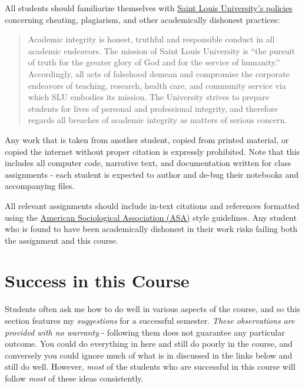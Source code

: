 \documentclass[
]{book}
\begin{document}
All students should familiarize themselves with \href{http://www.slu.edu/Documents/provost/academic_affairs/Academic\%20Integrity\%20Policy\%20FINAL\%20\%206-26-15.pd}{Saint Louis University's policies} concerning cheating, plagiarism, and other academically dishonest practices:

\begin{quote}
Academic integrity is honest, truthful and responsible conduct in all academic endeavors. The mission of Saint Louis University is ``the pursuit of truth for the greater glory of God and for the service of humanity.'' Accordingly, all acts of falsehood demean and compromise the corporate endeavors of teaching, research, health care, and community service via which SLU embodies its mission. The University strives to prepare students for lives of personal and professional integrity, and therefore regards all breaches of academic integrity as matters of serious concern.
\end{quote}

Any work that is taken from another student, copied from printed material, or copied the internet without proper citation is expressly prohibited. Note that this includes all computer code, narrative text, and documentation written for class assignments - each student is expected to author and de-bug their notebooks and accompanying files.

All relevant assignments should include in-text citations and references formatted using the \href{https://owl.english.purdue.edu/owl/resource/583/1/}{American Sociological Association (ASA)} style guidelines. Any student who is found to have been academically dishonest in their work risks failing both the assignment and this course.

\hypertarget{success-in-this-course}{%
\chapter{Success in this Course}\label{success-in-this-course}}

Students often ask me how to do well in various aspects of the course, and so this section features my \emph{suggestions} for a successful semester. \emph{These observations are provided with no warranty} - following them does not guarantee any particular outcome. You could do everything in here and still do poorly in the course, and conversely you could ignore much of what is in discussed in the links below and still do well. However, \emph{most} of the students who are successful in this course will follow \emph{most} of these ideas consistently.
\end{document}
